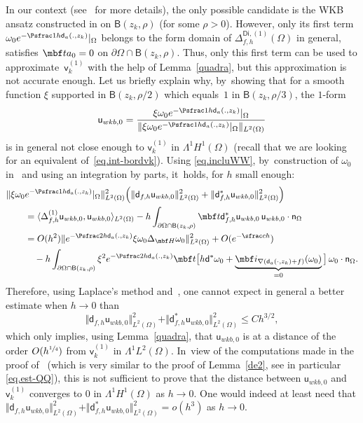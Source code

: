 In our context (see~\cite[\S1.4]{DoNe2} for more details),
the only possible candidate is the WKB ansatz constructed in
\cite[\S2]{helffer-sjostrand-85}
on $\mathsf B(z_k,\rho)$ (for
some $\rho>0$).
However,
only
its first term $\omega_0e^{-\Psfrac 1h \mathsf d_a(.,z_k)}|_\Omega$
belongs to the form domain of
$\Delta_{f,h}^{\mathsf{Di},(1)}(\Omega)$ in general, \ie satisfies $\mbf t
a_0=0$ on $\partial \Omega\cap \mathsf B(z_k,\rho)$. Thus, only this first term
can be used
to approximate~$\mathsf v_k^{(1)} $ with the help of Lemma~\ref{quadra}, but this approximation
is not accurate enough.
Let us briefly explain why, by~showing that
for a smooth function
$\xi $
supported in $\mathsf B(z_k,\rho/2)$ which equals~$1$ in $\mathsf
B(z_k,\rho/3)$, the $1$-form
\[
\mathsf u_{{wkb,0}}= \frac{\xi \omega_0e^{-\Psfrac 1h \mathsf d_a(.,z_k)}|_\Omega}{\Vert \xi \omega_0e^{-\Psfrac 1h \mathsf d_a(.,z_k)}|_\Omega\Vert_{L^{2}(\Omega)}}
\]
is in general not close enough to $\mathsf v_k^{(1)} $ in $\Lambda^1H^1(\Omega)$ (recall that we are looking for an equivalent of~\eqref{eq.int-bordvk}).
Using \eqref{eq.incluWW}, by~construction of $\omega_0$ in~\cite[Th.\,2.5]{helffer-sjostrand-85} and using an integration by parts, it~holds, for $h$ small enough:
\begin{align*}
\Vert \xi \omega_0&e^{-\Psfrac 1h \mathsf d_a(.,z_k)}|_\Omega\Vert^{2}_{L^{2}(\Omega)}\Bigl(\Vert \mathsf d_{f,h}\mathsf u_{{wkb,0}}\Vert^2_{L^2(\Omega)}+\Vert \mathsf d^*_{f,h}\mathsf u_{{wkb,0}}\Vert^2_{L^2(\Omega)}\Bigr)\\
& = \langle \Delta^{(1)}_{f,h}\mathsf u_{{wkb,0}},\mathsf u_{{wkb,0}}\rangle_{L^2(\Omega)}- h\int_{\partial \Omega\cap \mathsf B(z_k,\rho)} \mbf t \mathsf d_{f,h}^* \mathsf u_{{wkb,0}}\, \mathsf u_{{wkb,0}}\cdot \mathsf n_\Omega\\
&=O(h^2) \Vert e^{-\Psfrac 2h \mathsf d_a(.,z_k)} \xi \omega_0\Delta_{\mbf H}\omega_0 \Vert^2_{L^2(\Omega)} +O(e^{-\sfrac ch})\\
&\quad -h\int_{\partial \Omega\cap \mathsf B(z_k,\rho)} \xi^2 e^{-\Psfrac 2h \mathsf d_a(.,z_k)} \mbf t \big[h\mathsf d^*\omega_0+\underbrace{\mbf i_{ \nabla(\mathsf d_a(\cdot,z_k)+f)}(\omega_0)}_{=0} \big] \, \omega_0\cdot \mathsf n_\Omega.
\end{align*}
Therefore, using Laplace's method and~\cite[Th.\,2.5]{helffer-sjostrand-85}, one cannot expect in general a better estimate
when $h\to0$ than
\[
\Vert \mathsf d_{f,h}\mathsf u_{{wkb,0}}\Vert^2_{L^2(\Omega)}+\Vert \mathsf d^*_{f,h}\mathsf u_{{wkb,0}}\Vert^2_{L^2(\Omega)}\le Ch^{3/2},
\]
which only implies, using Lemma~\ref{quadra}, that $\mathsf u_{{wkb,0}}$ is at a distance of the order $O(h^{\sfrac14})$
from $ \mathsf v_k^{(1)}
$ in $\Lambda^1L^2(\Omega)$. In~view of the computations made in the proof of~\cite[Prop.\,90]{DLLN} (which is very similar to the proof of
Lemma~\ref{de2}, see in particular \eqref{eq.est-QQ}),
this is not sufficient to prove that the distance between
$\mathsf u_{{wkb,0}}$ and $ \mathsf v_k^{(1)}$ converges to $0$
in $\Lambda^1H^1(\Omega)$ as $h\to 0$.
One would indeed
at least need that $ \Vert
\mathsf d_{f,h}\mathsf u_{{wkb,0}}\Vert^2_{L^2(\Omega)}+\Vert
\mathsf d^*_{f,h}\mathsf u_{{wkb,0}}\Vert^2_{L^2(\Omega)}=o(h^{3})$ as
$h\to 0$.

